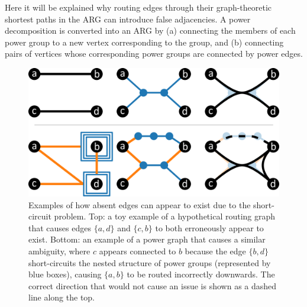 Here it will be explained why routing edges through their graph-theoretic shortest paths in the ARG can introduce false adjacencies.
A power decomposition is converted into an ARG by (a) connecting the members of each power group to a new vertex corresponding to the group, and (b) connecting pairs of vertices whose corresponding power groups are connected by power edges.
\begin{figure}
  \centering
  \includegraphics[width=.8\linewidth]{power/shortcircuit.pdf}
  \caption[Examples of the short-circuit problem]{Examples of how absent edges can appear to exist due to the short-circuit problem.
  Top: a toy example of a hypothetical routing graph that causes edges $\{a,d\}$ and $\{c,b\}$ to both erroneously appear to exist.
  Bottom: an example of a power graph that causes a similar ambiguity, where $c$ appears connected to $b$ because the edge $\{b,d\}$ short-circuits the nested structure of power groups (represented by blue boxes), causing $\{a,b\}$ to be routed incorrectly downwards.
  The correct direction that would not cause an issue is shown as a dashed line along the top.
  }
  \label{fig:overlap}
\end{figure}
